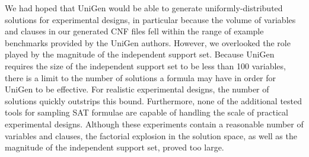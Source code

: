 We had hoped that UniGen would be able to generate uniformly-distributed solutions for experimental designs, in particular because the volume of variables and clauses in our generated CNF files fell within the range of example benchmarks provided by the UniGen authors. However, we overlooked the role played by the magnitude of the independent support set. Because UniGen requires the size of the independent support set to be less than 100 variables, there is a limit to the number of solutions a formula may have in order for UniGen to be effective. For realistic experimental designs, the number of solutions quickly outstrips this bound. Furthermore, none of the additional tested tools for sampling SAT formulae are capable of handling the scale of practical experimental designs. Although these experiments contain a reasonable number of variables and clauses, the factorial explosion in the solution space, as well as the magnitude of the independent support set, proved too large.
